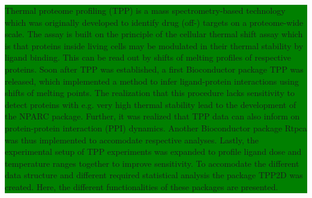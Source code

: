 \documentclass{article}
\newcommand{\hcode}[2][lgray]{{\ttfamily\color{vdgray}\colorbox{#1}{#2}}}
\begin{document}
\noindent
\colorbox{green}{
  \noindent
  \begin{minipage}[t]{\textwidth}
    \vspace{.15cm}
    \large 
      Thermal proteome profiling (TPP) is a mass spectrometry-based 
      technology which was originally developed to identify drug (off-)
      targets on a proteome-wide scale. The assay is built on the principle
      of the cellular thermal shift assay which is that proteins inside living
      cells may be modulated in their thermal stability by ligand binding.
      This can be read out by shifts of melting profiles of respective proteins. 
      Soon after TPP was established, a first Bioconductor package \hcode{TPP} 
      was released, which implemented a method to infer ligand-protein interactions
      using shifts of melting points. The realization that this procedure 
      lacks sensitivity to detect proteins with e.g. very high thermal stability lead 
      to the development of the \hcode{NPARC} package. 
      Further, it was realized that TPP data can also inform on protein-protein 
      interaction (PPI) dynamics. Another Bioconductor package \hcode{Rtpca} was thus implemented
      to accomodate respective analyses. 
      Lastly, the experimental setup of TPP experiments was expanded to profile ligand
      dose and temperature ranges together to improve sensitivity. To accomodate the 
      different data structure and different required statistical analysis the package
      \hcode{TPP2D} was created. Here, the different functionalities of these packages are presented. 
      
    \vspace{0.1cm}
  \end{minipage}
}
\vspace{-1cm}
\end{document}
